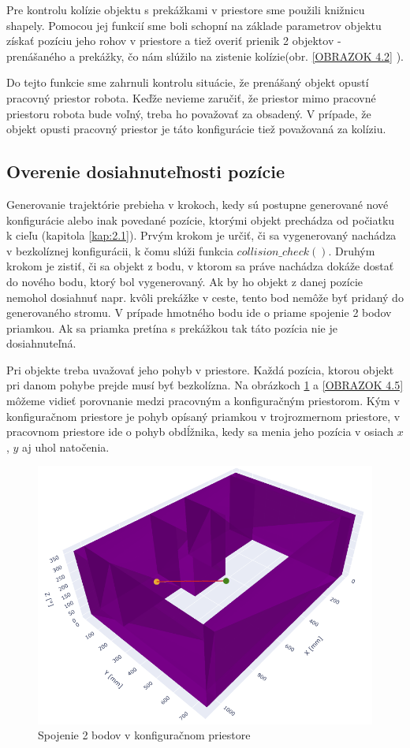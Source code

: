 Pre kontrolu kolízie objektu s prekážkami v priestore sme použili knižnicu shapely. Pomocou jej funkcií sme boli schopní na základe parametrov objektu získať pozíciu jeho rohov v priestore a tiež overiť prienik 2 objektov - prenášaného a prekážky, čo nám slúžilo na zistenie kolízie(obr. \ref{OBRAZOK 4.2} ).

Do tejto funkcie sme zahrnuli kontrolu situácie, že prenášaný objekt opustí pracovný priestor robota. Keďže nevieme zaručiť, že priestor mimo pracovné priestoru robota bude voľný, treba ho považovať za obsadený. V prípade, že objekt opusti pracovný priestor je táto konfigurácie tiež považovaná za kolíziu. 
 
\subsection{Overenie dosiahnuteľnosti pozície}

Generovanie trajektórie prebieha v krokoch, kedy sú postupne generované nové konfigurácie alebo inak povedané pozície, ktorými objekt prechádza od počiatku k cieľu (kapitola \ref{kap:2.1}). Prvým krokom je určiť, či sa vygenerovaný nachádza v bezkolíznej konfigurácii, k čomu slúži funkcia $ collision\_check() $. Druhým krokom je zistiť, či sa objekt z bodu, v ktorom sa práve nachádza dokáže dostať do nového bodu, ktorý bol vygenerovaný. Ak by ho objekt z danej pozície nemohol dosiahnuť napr. kvôli prekážke v ceste, tento bod nemôže byť pridaný do generovaného stromu. V prípade hmotného bodu ide o priame spojenie 2 bodov priamkou. Ak sa priamka pretína s prekážkou tak táto pozícia nie je dosiahnuteľná. 

Pri objekte treba uvažovať jeho pohyb v priestore.  Každá pozícia, ktorou objekt pri danom pohybe prejde musí byť bezkolízna. Na obrázkoch \ref{OBRAZOK 4.4} a \ref{OBRAZOK 4.5} môžeme vidieť porovnanie medzi pracovným a konfiguračným priestorom.  Kým v konfiguračnom priestore je pohyb opísaný priamkou v trojrozmernom priestore, v pracovnom priestore ide o pohyb obdĺžnika, kedy sa menia jeho pozícia v osiach $ x $, $ y $ aj uhol natočenia.

\begin{figure}[h!]
	\centering
	\includegraphics[width=120mm]{img/Path_sampling-Searchspace.png}
	\caption{Spojenie 2 bodov v konfiguračnom priestore} \label{OBRAZOK 4.4} 
\end{figure} 

